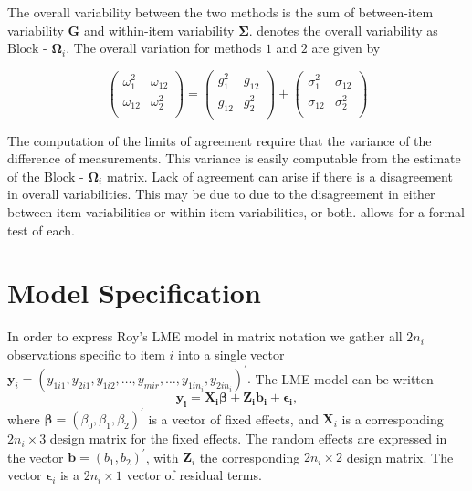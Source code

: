 \documentclass[12pt, a4paper]{report}
\theoremstyle{plain}
\theoremstyle{definition}
\theoremstyle{remark}
\begin{document}
	

The overall variability between
the two methods is the sum of between-item variability
$\boldsymbol{G}$ and within-item variability
$\boldsymbol{\Sigma}$. \citet{ARoy2009} denotes the overall variability
as ${\mbox{Block - }\boldsymbol \Omega_{i}}$. The overall
variation for methods $1$ and $2$ are given by


\begin{center}
	\[\left(\begin{array}{cc}
	\omega^2_1  & \omega_{12} \\
	\omega_{12} & \omega^2_2 \\
	\end{array}  \right)
	=  \left(
	\begin{array}{cc}
	g^2_1  & g_{12} \\
	g_{12} & g^2_2 \\
	\end{array} \right)+
	\left(
	\begin{array}{cc}
	\sigma^2_1  & \sigma_{12} \\
	\sigma_{12} & \sigma^2_2 \\
	\end{array}\right)
	\]
\end{center}
The computation of the limits of agreement require that the variance of the difference of measurements. This variance is easily computable from the estimate of the ${\mbox{Block - }\boldsymbol \Omega_{i}}$ matrix. Lack of agreement can arise if there is a disagreement in overall variabilities. This may be due to due to the disagreement in either between-item
variabilities or within-item variabilities, or both. \citet{roy} allows for a formal test of each.

\newpage
		\section{Model Specification}
		In order to express Roy's LME model in matrix notation we gather all $2n_i$ observations specific to item $i$ into a single vector  $\boldsymbol{y}_{i} = (y_{1i1},y_{2i1},y_{1i2},\ldots,y_{mir},\ldots,y_{1in_{i}},y_{2in_{i}})^\prime.$ The LME model can be written
		\[
		\boldsymbol{y_{i}} = \boldsymbol{X_{i}\beta} + \boldsymbol{Z_{i}b_{i}} + \boldsymbol{\epsilon_{i}},
		\]
		where $\boldsymbol{\beta}=(\beta_0,\beta_1,\beta_2)^\prime$ is a vector of fixed effects, and $\boldsymbol{X}_i$ is a corresponding $2n_i\times 3$ design matrix for the fixed effects. The random effects are expressed in the vector $\boldsymbol{b}=(b_1,b_2)^\prime$, with $\boldsymbol{Z}_i$ the corresponding $2n_i\times 2$ design matrix. The vector $\boldsymbol{\epsilon}_i$ is a $2n_i\times 1$ vector of residual terms.
		
\end{document}
